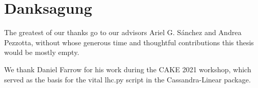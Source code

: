 

\chapter*{Danksagung}

The greatest of our thanks go to our advisors Ariel G. S\'{a}nchez and Andrea
Pezzotta, without whose generous time and thoughtful contributions this thesis
would be mostly empty.

We thank Daniel Farrow for his work during the CAKE 2021 workshop, which
served as the basis for the vital lhc.py script in the Cassandra-Linear
package.

